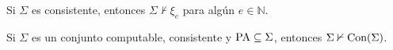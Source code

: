 \documentclass[12pt]{report}
\theoremstyle{largebreak}
\begin{document}
    \begin{cor}
        Si $\Sigma$ es consistente, entonces $\Sigma\nvdash\xi_e$ para algún $e\in\mathbb{N}$.
    \end{cor}

    \begin{theor}
        Si $\Sigma$ es un conjunto computable, consistente y $\textup{PA}\subseteq\Sigma$, entonces $\Sigma\nvdash\textup{Con}(\Sigma)$.
    \end{theor}
    
\end{document}
